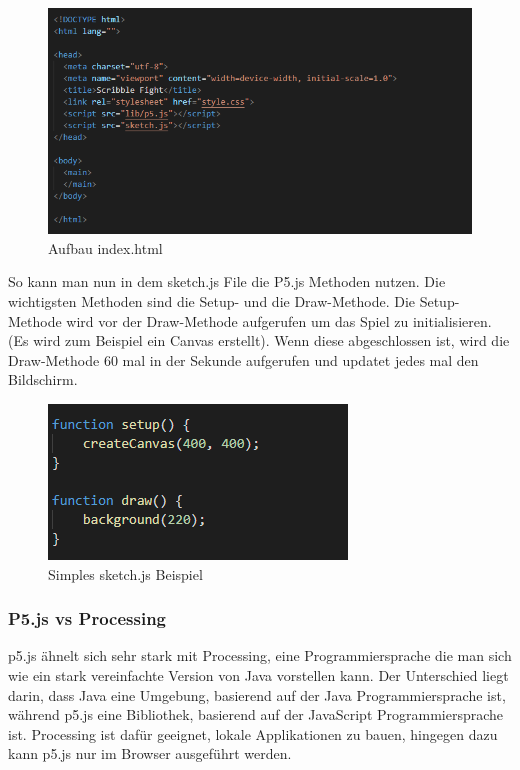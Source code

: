 \begin{figure}[H]
    \centering
    \includegraphics[scale=1]{pics/index html.PNG}
    \caption{Aufbau index.html}
\end{figure}

So kann man nun in dem sketch.js File die P5.js Methoden nutzen. Die wichtigsten Methoden sind die Setup- und die Draw-Methode.
Die Setup-Methode wird vor der Draw-Methode aufgerufen um das Spiel zu initialisieren. (Es wird zum Beispiel ein Canvas erstellt).
Wenn diese abgeschlossen ist, wird die Draw-Methode 60 mal in der Sekunde aufgerufen und updatet jedes mal den Bildschirm.

\begin{figure}[H]
    \centering
    \includegraphics[scale=1]{pics/sketch.PNG}
    \caption{Simples sketch.js Beispiel}
\end{figure}

\subsubsection{P5.js vs Processing}
p5.js ähnelt sich sehr stark mit Processing, eine Programmiersprache die man sich wie ein stark vereinfachte Version von Java vorstellen kann.
Der Unterschied liegt darin, dass Java eine Umgebung, basierend auf der Java Programmiersprache ist, während p5.js eine Bibliothek, basierend auf der JavaScript Programmiersprache ist.
Processing ist dafür geeignet, lokale Applikationen zu bauen, hingegen dazu kann p5.js nur im Browser ausgeführt werden.

